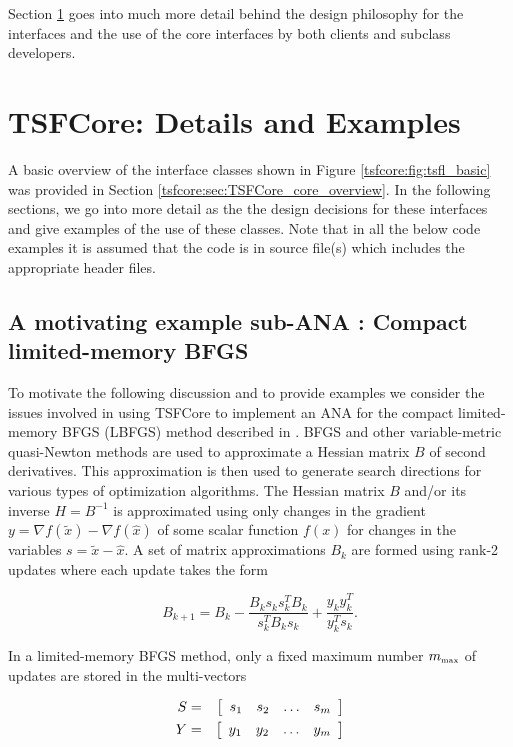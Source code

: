 \documentclass[10pt,fleqn]{article}
\begin{document}
Section \ref{tsfcore:sec:TSFCore_Details} goes into much more detail behind
the design philosophy for the interfaces and the use of the core
interfaces by both clients and subclass developers.

%
\section{TSFCore: Details and Examples}
\label{tsfcore:sec:TSFCore_Details}
%

A basic overview of the interface classes shown in Figure
\ref{tsfcore:fig:tsfl_basic} was provided in Section
\ref{tsfcore:sec:TSFCore_core_overview}.  In the following sections, we go into
more detail as the the design decisions for these interfaces and give
examples of the use of these classes.  Note that in all the below code
examples it is assumed that the code is in source file(s) which
includes the appropriate header files.

%
\subsection{A motivating example sub-ANA : Compact limited-memory BFGS}
\label{tsfcore:sec:LBFGS}
%

To motivate the following discussion and to provide examples we
consider the issues involved in using TSFCore to implement an ANA for the
compact limited-memory BFGS (LBFGS) method described in
\cite{ref:byrd_et_all_lbfgs_1994}.  BFGS and other variable-metric
quasi-Newton methods are used to approximate a Hessian matrix $B$ of
second derivatives.  This approximation is then used to generate
search directions for various types of optimization algorithms.  The
Hessian matrix $B$ and/or its inverse $H = B^{-1}$ is approximated
using only changes in the gradient $y = \nabla f(\tilde{x}) - \nabla
f(\hat{x})$ of some scalar function $f(x)$ for changes in the
variables $s = \tilde{x} - \hat{x}$.  A set of matrix approximations
$B_k$ are formed using rank-2 updates where each update takes the
form

\begin{equation}
B_{k+1} = B_k - \frac{B_k s_k s_k^T B_k}{s_k^T B_k s_k} + \frac{y_k y_k^T}{y_k^T s_k}.
\end{equation}

In a limited-memory BFGS method, only a fixed maximum number
$m_{\tiny\mbox{max}}$ of updates are stored in the multi-vectors

\begin{eqnarray}
S & = & {\bmat{cccc} s_1 & s_2 & \ldots & s_{m} \emat} \\
Y & = & {\bmat{cccc} y_1 & y_2 & \ldots & y_{m} \emat}
\end{eqnarray}
\end{document}
